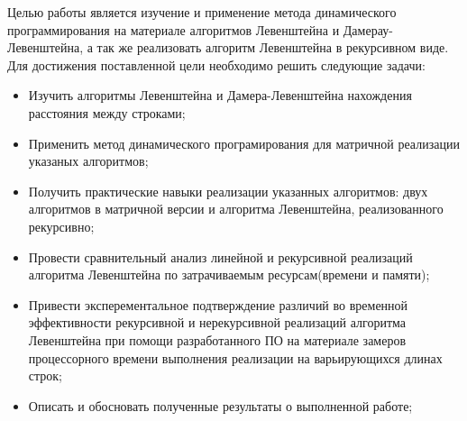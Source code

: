 \Introduction

Целью работы является изучение и применение метода динамического программирования на материале алгоритмов Левенштейна и Дамерау-Левенштейна, а так же реализовать алгоритм Левенштейна в рекурсивном виде. Для достижения поставленной цели необходимо решить следующие задачи:

\begin{itemize}
\item Изучить алгоритмы Левенштейна и Дамера-Левенштейна нахождения расстояния между строками;
\item Применить метод динамического програмирования для матричной реализации указаных алгоритмов;
\item Получить практические навыки реализации указанных алгоритмов: двух алгоритмов в матричной версии и алгоритма Левенштейна, реализованного рекурсивно;
\item Провести сравнительный анализ линейной и рекурсивной реализаций алгоритма Левенштейна по затрачиваемым ресурсам(времени и памяти);
\item Привести эксперементальное подтверждение различий во временной эффективности рекурсивной и нерекурсивной реализаций алгоритма Левенштейна при помощи разработанного ПО на материале замеров процессорного времени выполнения реализации на варьирующихся длинах строк;
\item Описать и обосновать полученные результаты о выполненной работе;
\end{itemize}
